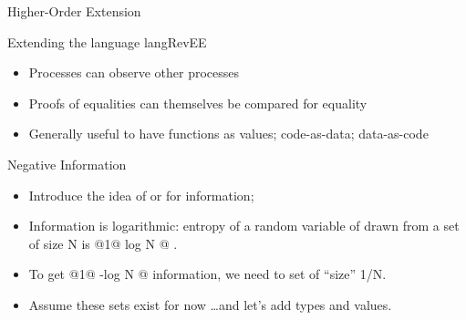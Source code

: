 \documentclass[11pt]{beamer}
\newcommand{\red}[1]{{\color{red}{#1}}}
\begin{document}
\begin{frame}{}

\vfill
{\Large \centerline{Higher-Order Extension}}

\vfill

\end{frame}

\begin{frame}{Extending the language {{langRevEE}} } 

\begin{itemize}
\vfill\item Processes can observe other processes

\vfill\item Proofs of equalities can themselves be compared for equality

\vfill\item Generally useful to have functions as values; code-as-data;
data-as-code

\end{itemize}

\vfill

\end{frame}

\begin{frame}{Negative Information}

\begin{itemize}
  \vfill\item Introduce the idea of \red{negative information} or
  \red{request} for information; 

  \vfill\item Information is logarithmic: entropy of a random variable of
  drawn from a set of size {{N}} is {{ {@1@ log N @} }}. 

  \vfill\item To get {{ {@1@ -log N @} }} information, we need to set of
  ``size'' {{1/N}}.

  \vfill\item Assume these sets exist for now \ldots and let's add
  \red{fractional} types and values.

\end{itemize}

\vfill

\end{frame}
\end{document}
